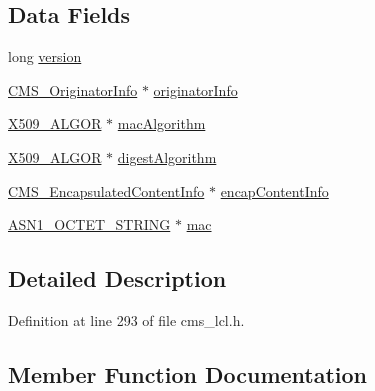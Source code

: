 \subsection*{Data Fields}
\begin{DoxyCompactItemize}
\item 
long \hyperlink{struct_c_m_s___authenticated_data__st_a17afc5cf84cee4b2123665f28ce85c9f}{version}
\item 
\hyperlink{cms__lcl_8h_a4c325dbee271c3317533c278d43bd6e3}{C\+M\+S\+\_\+\+Originator\+Info} $\ast$ \hyperlink{struct_c_m_s___authenticated_data__st_af71df251d1c4387b50929a2321309403}{originator\+Info}
\item 
\hyperlink{crypto_2ossl__typ_8h_aa2b6185e6254f36f709cd6577fb5022e}{X509\+\_\+\+A\+L\+G\+OR} $\ast$ \hyperlink{struct_c_m_s___authenticated_data__st_a4c916082612c1378c464dc6d0820c1d1}{mac\+Algorithm}
\item 
\hyperlink{crypto_2ossl__typ_8h_aa2b6185e6254f36f709cd6577fb5022e}{X509\+\_\+\+A\+L\+G\+OR} $\ast$ \hyperlink{struct_c_m_s___authenticated_data__st_a3db9734e20b06af31aabcfcfc6b62797}{digest\+Algorithm}
\item 
\hyperlink{cms__lcl_8h_a43d5fbe8d3d48436737af5049d312acc}{C\+M\+S\+\_\+\+Encapsulated\+Content\+Info} $\ast$ \hyperlink{struct_c_m_s___authenticated_data__st_a436b5725775d32c6f9a979b8d5a4f8b5}{encap\+Content\+Info}
\item 
\hyperlink{crypto_2ossl__typ_8h_afbd05e94e0f0430a2b729473efec88c1}{A\+S\+N1\+\_\+\+O\+C\+T\+E\+T\+\_\+\+S\+T\+R\+I\+NG} $\ast$ \hyperlink{struct_c_m_s___authenticated_data__st_aa893ed9bbf8c8c1ebc8af697cac800c6}{mac}
\end{DoxyCompactItemize}


\subsection{Detailed Description}


Definition at line 293 of file cms\+\_\+lcl.\+h.



\subsection{Member Function Documentation}
